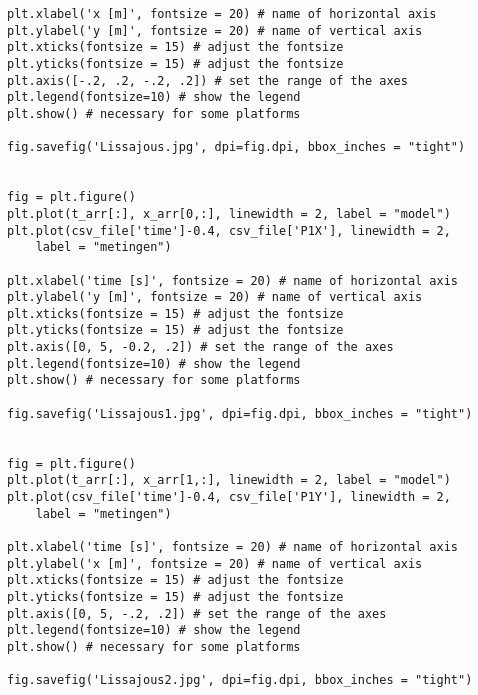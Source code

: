 \documentclass[a4paper]{article}
\begin{document}
\begin{lstlisting}
plt.xlabel('x [m]', fontsize = 20) # name of horizontal axis 
plt.ylabel('y [m]', fontsize = 20) # name of vertical axis
plt.xticks(fontsize = 15) # adjust the fontsize 
plt.yticks(fontsize = 15) # adjust the fontsize 
plt.axis([-.2, .2, -.2, .2]) # set the range of the axes
plt.legend(fontsize=10) # show the legend 
plt.show() # necessary for some platforms

fig.savefig('Lissajous.jpg', dpi=fig.dpi, bbox_inches = "tight")


fig = plt.figure() 
plt.plot(t_arr[:], x_arr[0,:], linewidth = 2, label = "model")
plt.plot(csv_file['time']-0.4, csv_file['P1X'], linewidth = 2,
	label = "metingen")

plt.xlabel('time [s]', fontsize = 20) # name of horizontal axis 
plt.ylabel('y [m]', fontsize = 20) # name of vertical axis
plt.xticks(fontsize = 15) # adjust the fontsize 
plt.yticks(fontsize = 15) # adjust the fontsize 
plt.axis([0, 5, -0.2, .2]) # set the range of the axes
plt.legend(fontsize=10) # show the legend 
plt.show() # necessary for some platforms

fig.savefig('Lissajous1.jpg', dpi=fig.dpi, bbox_inches = "tight")


fig = plt.figure() 
plt.plot(t_arr[:], x_arr[1,:], linewidth = 2, label = "model")
plt.plot(csv_file['time']-0.4, csv_file['P1Y'], linewidth = 2, 
	label = "metingen")
 
plt.xlabel('time [s]', fontsize = 20) # name of horizontal axis 
plt.ylabel('x [m]', fontsize = 20) # name of vertical axis
plt.xticks(fontsize = 15) # adjust the fontsize 
plt.yticks(fontsize = 15) # adjust the fontsize 
plt.axis([0, 5, -.2, .2]) # set the range of the axes
plt.legend(fontsize=10) # show the legend 
plt.show() # necessary for some platforms

fig.savefig('Lissajous2.jpg', dpi=fig.dpi, bbox_inches = "tight")
	\end{lstlisting}
		
	\clearpage
	\addtocounter{section}{1}
	

	
\end{document}

